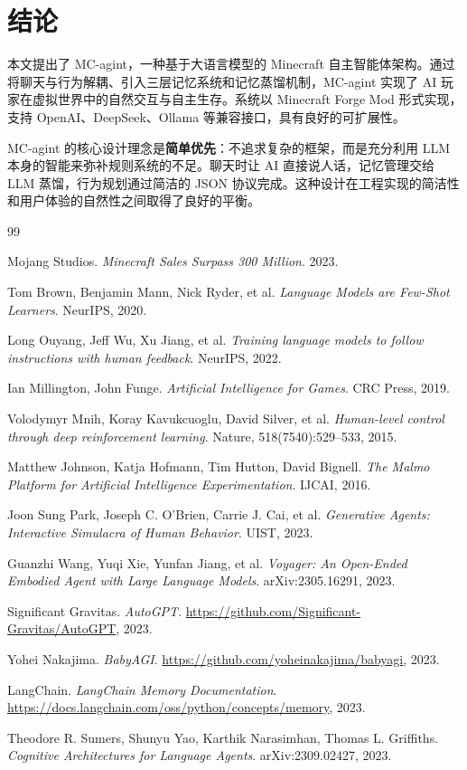 \documentclass[12pt,a4paper]{article}
\begin{document}
\section{结论}

本文提出了 MC-agint，一种基于大语言模型的 Minecraft 自主智能体架构。通过将聊天与行为解耦、引入三层记忆系统和记忆蒸馏机制，MC-agint 实现了 AI 玩家在虚拟世界中的自然交互与自主生存。系统以 Minecraft Forge Mod 形式实现，支持 OpenAI、DeepSeek、Ollama 等兼容接口，具有良好的可扩展性。

MC-agint 的核心设计理念是\textbf{简单优先}：不追求复杂的框架，而是充分利用 LLM 本身的智能来弥补规则系统的不足。聊天时让 AI 直接说人话，记忆管理交给 LLM 蒸馏，行为规划通过简洁的 JSON 协议完成。这种设计在工程实现的简洁性和用户体验的自然性之间取得了良好的平衡。

\newpage
\begin{thebibliography}{99}

Mojang Studios.
\textit{Minecraft Sales Surpass 300 Million}.
2023.

Tom Brown, Benjamin Mann, Nick Ryder, et al.
\textit{Language Models are Few-Shot Learners}.
NeurIPS, 2020.

Long Ouyang, Jeff Wu, Xu Jiang, et al.
\textit{Training language models to follow instructions with human feedback}.
NeurIPS, 2022.

Ian Millington, John Funge.
\textit{Artificial Intelligence for Games}.
CRC Press, 2019.

Volodymyr Mnih, Koray Kavukcuoglu, David Silver, et al.
\textit{Human-level control through deep reinforcement learning}.
Nature, 518(7540):529--533, 2015.

Matthew Johnson, Katja Hofmann, Tim Hutton, David Bignell.
\textit{The Malmo Platform for Artificial Intelligence Experimentation}.
IJCAI, 2016.

Joon Sung Park, Joseph C. O'Brien, Carrie J. Cai, et al.
\textit{Generative Agents: Interactive Simulacra of Human Behavior}.
UIST, 2023.

Guanzhi Wang, Yuqi Xie, Yunfan Jiang, et al.
\textit{Voyager: An Open-Ended Embodied Agent with Large Language Models}.
arXiv:2305.16291, 2023.

Significant Gravitas.
\textit{AutoGPT}.
\url{https://github.com/Significant-Gravitas/AutoGPT}, 2023.

Yohei Nakajima.
\textit{BabyAGI}.
\url{https://github.com/yoheinakajima/babyagi}, 2023.

LangChain.
\textit{LangChain Memory Documentation}.
\url{https://docs.langchain.com/oss/python/concepts/memory}, 2023.

Theodore R. Sumers, Shunyu Yao, Karthik Narasimhan, Thomas L. Griffiths.
\textit{Cognitive Architectures for Language Agents}.
arXiv:2309.02427, 2023.

\end{thebibliography}
\end{document}
